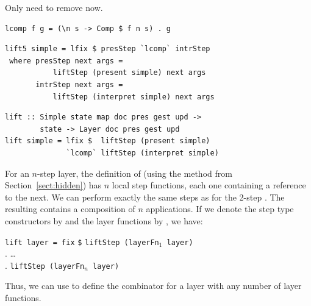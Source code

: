 \documentclass[preprint,natbib]{sigplanconf}
\begin{document}
Only need to remove  now. 

\begin{small}
\begin{verbatim}
lcomp f g = (\n s -> Comp $ f n s) . g
\end{verbatim}%
\end{small}

\begin{small} %
\begin{verbatim}
lift5 simple = lfix $ presStep `lcomp` intrStep
 where presStep next args = 
           liftStep (present simple) next args
       intrStep next args = 
           liftStep (interpret simple) next args
\end{verbatim}%
\end{small}


\begin{small} %
\begin{verbatim}
lift :: Simple state map doc pres gest upd ->
        state -> Layer doc pres gest upd
lift simple = lfix $  liftStep (present simple) 
              `lcomp` liftStep (interpret simple) 
\end{verbatim}%
\end{small}



For an $n$-step layer, the definition of  (using the method from Section~\ref{sect:hidden}) has $n$ local step functions, each one containing a reference to the next. \bc {} \ec We can perform exactly the same steps as for the 2-step . The resulting  contains a composition of $n$  applications. If we denote the step type constructors by  and the layer functions by , we have:

\begin{small}
\begin{tabbing}
{\tt lift layer = fix} \= {\tt \$} \= {\tt liftStep (layerFn$_1$ layer)} \\
                       \> .        \> \dots\ \\
                       \> .        \> {\tt liftStep (layerFn$_n$ layer)}\\
\end{tabbing}%
\end{small}

Thus, we can use   to define the  combinator for a layer with any number of layer functions.
\end{document}
